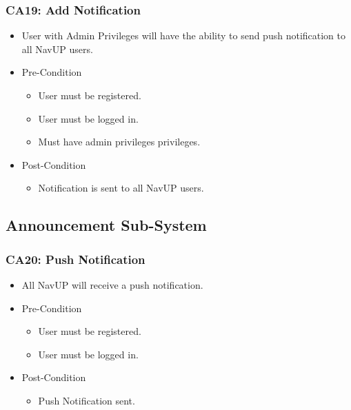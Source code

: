\documentclass[12pt,a4paper]{article}
\begin{document}
		\subsubsection{CA19: Add Notification}
			\begin{itemize}
				\item User with Admin Privileges will have the ability to send push notification to all NavUP users.
					\item Pre-Condition
						\begin{itemize}
							\item User must be registered.
							\item User must be logged in.
							\item Must have admin privileges privileges.
						\end{itemize}
					\item Post-Condition
						\begin{itemize}
							\item Notification is sent to all NavUP users.
						\end{itemize}
			\end{itemize}
	\subsection{Announcement Sub-System}
		\subsubsection{CA20: Push Notification}
			\begin{itemize}
				\item All NavUP will receive a push notification.
					\item Pre-Condition
						\begin{itemize}
							\item User must be registered.
							\item User must be logged in.
						\end{itemize}
					\item Post-Condition
						\begin{itemize}
							\item Push Notification sent.
						\end{itemize}
			\end{itemize}
\end{document}
